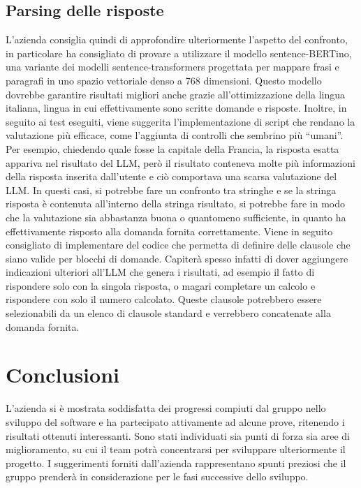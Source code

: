 \documentclass[10pt]{article}
\begin{document}
    \subsection{Parsing delle risposte}
    L’azienda consiglia quindi di approfondire ulteriormente l’aspetto del confronto, in particolare ha consigliato di provare a utilizzare il modello sentence-BERTino, una variante dei modelli sentence-transformers progettata per mappare frasi e paragrafi in uno spazio vettoriale denso a 768 dimensioni. Questo modello dovrebbe garantire risultati migliori anche grazie all’ottimizzazione della lingua italiana, lingua in cui effettivamente sono scritte domande e risposte.
    Inoltre, in seguito ai test eseguiti, viene suggerita l’implementazione di script che rendano la valutazione più efficace, come l’aggiunta di controlli che sembrino più “umani”. Per esempio, chiedendo quale fosse la capitale della Francia, la risposta esatta appariva nel risultato del LLM, però il risultato conteneva molte più informazioni della risposta inserita dall’utente e ciò comportava una scarsa valutazione del LLM. In questi casi, si potrebbe fare un confronto tra stringhe e se la stringa risposta è contenuta all’interno della stringa risultato, si potrebbe fare in modo che la valutazione sia abbastanza buona o quantomeno sufficiente, in quanto ha effettivamente risposto alla domanda fornita correttamente.
    Viene in seguito consigliato di implementare del codice che permetta di definire delle clausole che siano valide per blocchi di domande. Capiterà spesso infatti di dover aggiungere indicazioni ulteriori all’LLM che genera i risultati, ad esempio il fatto di rispondere solo con la singola risposta, o magari completare un calcolo e rispondere con solo il numero calcolato. Queste clausole potrebbero essere selezionabili da un elenco di clausole standard e verrebbero concatenate alla domanda fornita.
    
    
    \newpage
    
    \section{Conclusioni}
    L’azienda si è mostrata soddisfatta dei progressi compiuti dal gruppo nello sviluppo del software e ha partecipato attivamente ad alcune prove, ritenendo i risultati ottenuti interessanti.
Sono stati individuati sia punti di forza sia aree di miglioramento, su cui il team potrà concentrarsi per sviluppare ulteriormente il progetto. I suggerimenti forniti dall’azienda rappresentano spunti preziosi che il gruppo prenderà in considerazione per le fasi successive dello sviluppo.

    \newpage
    \newpage
\end{document}
